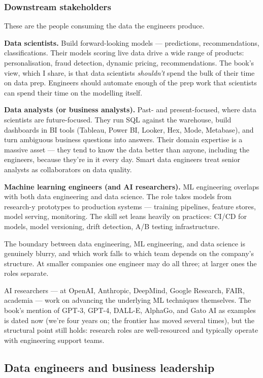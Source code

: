\subsubsection{Downstream stakeholders}

These are the people consuming the data the engineers produce.

\textbf{Data scientists.} Build forward-looking models — predictions, recommendations, classifications. Their models scoring live data drive a wide range of products: personalisation, fraud detection, dynamic pricing, recommendations. The book's view, which I share, is that data scientists \emph{shouldn't} spend the bulk of their time on data prep. Engineers should automate enough of the prep work that scientists can spend their time on the modelling itself.

\textbf{Data analysts (or business analysts).} Past- and present-focused, where data scientists are future-focused. They run SQL against the warehouse, build dashboards in BI tools (Tableau, Power BI, Looker, Hex, Mode, Metabase), and turn ambiguous business questions into answers. Their domain expertise is a massive asset — they tend to know the data better than anyone, including the engineers, because they're in it every day. Smart data engineers treat senior analysts as collaborators on data quality.

\textbf{Machine learning engineers (and AI researchers).} ML engineering overlaps with both data engineering and data science. The role takes models from research-y prototypes to production systems — training pipelines, feature stores, model serving, monitoring. The skill set leans heavily on  practices: CI/CD for models, model versioning, drift detection, A/B testing infrastructure.

The boundary between data engineering, ML engineering, and data science is genuinely blurry, and which work falls to which team depends on the company's structure. At smaller companies one engineer may do all three; at larger ones the roles separate.

AI researchers — at OpenAI, Anthropic, DeepMind, Google Research, FAIR, academia — work on advancing the underlying ML techniques themselves. The book's mention of GPT-3, GPT-4, DALL-E, AlphaGo, and Gato AI as examples is dated now (we're four years on; the frontier has moved several times), but the structural point still holds: research roles are well-resourced and typically operate with engineering support teams.

\subsection{Data engineers and business leadership}

